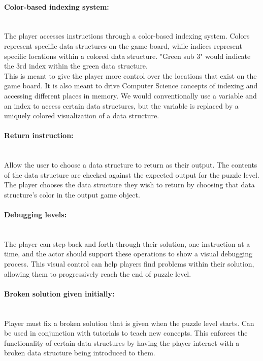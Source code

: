 \paragraph{Color-based indexing system:} ~\\
The player accesses instructions through a color-based indexing system.
Colors represent specific data structures on the game board, while indices represent
specific locations within a colored data structure. "Green sub 3" would indicate the
3rd index within the green data structure.\\

This is meant to give the player more control over the locations that exist on the
game board. It is also meant to drive Computer Science concepts of indexing and accessing
different places in memory. We would conventionally use a variable and an index to access
certain data structures, but the variable is replaced by a uniquely colored visualization
of a data structure.\\

\paragraph{Return instruction:} ~\\
Allow the user to choose a data structure to return as their output. The
contents of the data structure are checked against the expected output for the
puzzle level. The player chooses the data structure they wish to return by choosing
that data structure's color in the output game object.\\

\paragraph{Debugging levels:} ~\\
The player can step back and forth through their solution, one instruction at a time,
and the actor should support these operations to show a visual debugging process. This
visual control can help players find problems within their solution, allowing them to
progressively reach the end of puzzle level.\\

\paragraph{Broken solution given initially:} ~\\
Player must fix a broken solution that is given when the puzzle level starts.
Can be used in conjunction with tutorials to teach new concepts. This enforces the functionality
of certain data structures by having the player interact with a broken data structure being
introduced to them.\\

